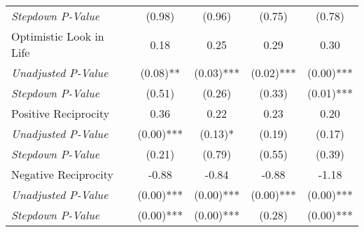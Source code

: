 \begin{tabular}{l c c c c}
\quad \textit{Stepdown P-Value} & (0.98) & (0.96) & (0.75) & (0.78) & \\
Optimistic Look in Life & 0.18 & 0.25 & 0.29 & 0.30 & \\
\quad \textit{Unadjusted P-Value} & (0.08)** & (0.03)*** & (0.02)*** & (0.00)*** & \\
\quad \textit{Stepdown P-Value} & (0.51) & (0.26) & (0.33) & (0.01)*** & \\
Positive Reciprocity & 0.36 & 0.22 & 0.23 & 0.20 & \\
\quad \textit{Unadjusted P-Value} & (0.00)*** & (0.13)* & (0.19) & (0.17) & \\
\quad \textit{Stepdown P-Value} & (0.21) & (0.79) & (0.55) & (0.39) & \\
Negative Reciprocity & -0.88 & -0.84 & -0.88 & -1.18 & \\
\quad \textit{Unadjusted P-Value} & (0.00)*** & (0.00)*** & (0.00)*** & (0.00)*** & \\
\quad \textit{Stepdown P-Value} & (0.00)*** & (0.00)*** & (0.28) & (0.00)*** & \\
\bottomrule
\end{tabular}
